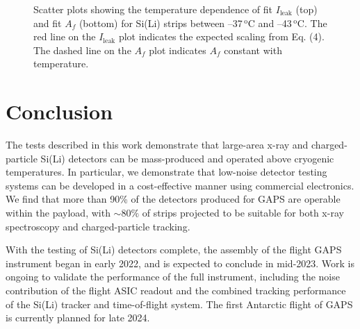 \documentclass[journal]{IEEEtran}
\begin{document}
\begin{figure}
    \centering
    
    
    
    
    \caption{Scatter plots showing the temperature dependence of fit $I_\text{leak}$ (top) and fit $A_f$ (bottom) for Si(Li) strips between --37$\,^\text{o}$C and --43$\,^\text{o}$C. The red line on the $I_\text{leak}$ plot indicates the expected scaling from Eq. (4). The dashed line on the $A_f$ plot indicates $A_f$ constant with temperature.}  
    \label{fig:ileak_af_temperature}
\end{figure}
\section{\label{sec:conclusion}Conclusion}
The tests described in this work demonstrate that large-area x-ray and charged-particle Si(Li) detectors can be mass-produced and operated above cryogenic temperatures. In particular, we demonstrate that low-noise detector testing systems can be developed in a cost-effective manner using commercial electronics. We find that more than 90\% of the detectors produced for GAPS are operable within the payload, with ${\sim}80\%$ of strips projected to be suitable for both x-ray spectroscopy and charged-particle tracking.
\par With the testing of Si(Li) detectors complete, the assembly of the flight GAPS instrument began in early 2022, and is expected to conclude in mid-2023. Work is ongoing to validate the performance of the full instrument, including the noise contribution of the flight ASIC readout and the combined tracking performance of the Si(Li) tracker and time-of-flight system. The first Antarctic flight of GAPS is currently planned for late 2024.  








\end{document}
